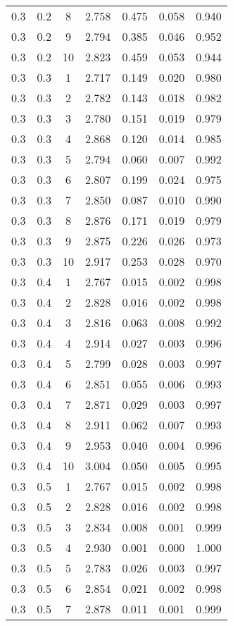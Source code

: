 \begin{tabular}{|c|c|c|c|c|c|c|}
0.3 & 0.2 & 8 & 2.758 & 0.475 & 0.058 & 0.940 \\
0.3 & 0.2 & 9 & 2.794 & 0.385 & 0.046 & 0.952 \\
0.3 & 0.2 & 10 & 2.823 & 0.459 & 0.053 & 0.944 \\
0.3 & 0.3 & 1 & 2.717 & 0.149 & 0.020 & 0.980 \\
0.3 & 0.3 & 2 & 2.782 & 0.143 & 0.018 & 0.982 \\
0.3 & 0.3 & 3 & 2.780 & 0.151 & 0.019 & 0.979 \\
0.3 & 0.3 & 4 & 2.868 & 0.120 & 0.014 & 0.985 \\
0.3 & 0.3 & 5 & 2.794 & 0.060 & 0.007 & 0.992 \\
0.3 & 0.3 & 6 & 2.807 & 0.199 & 0.024 & 0.975 \\
0.3 & 0.3 & 7 & 2.850 & 0.087 & 0.010 & 0.990 \\
0.3 & 0.3 & 8 & 2.876 & 0.171 & 0.019 & 0.979 \\
0.3 & 0.3 & 9 & 2.875 & 0.226 & 0.026 & 0.973 \\
0.3 & 0.3 & 10 & 2.917 & 0.253 & 0.028 & 0.970 \\
0.3 & 0.4 & 1 & 2.767 & 0.015 & 0.002 & 0.998 \\
0.3 & 0.4 & 2 & 2.828 & 0.016 & 0.002 & 0.998 \\
0.3 & 0.4 & 3 & 2.816 & 0.063 & 0.008 & 0.992 \\
0.3 & 0.4 & 4 & 2.914 & 0.027 & 0.003 & 0.996 \\
0.3 & 0.4 & 5 & 2.799 & 0.028 & 0.003 & 0.997 \\
0.3 & 0.4 & 6 & 2.851 & 0.055 & 0.006 & 0.993 \\
0.3 & 0.4 & 7 & 2.871 & 0.029 & 0.003 & 0.997 \\
0.3 & 0.4 & 8 & 2.911 & 0.062 & 0.007 & 0.993 \\
0.3 & 0.4 & 9 & 2.953 & 0.040 & 0.004 & 0.996 \\
0.3 & 0.4 & 10 & 3.004 & 0.050 & 0.005 & 0.995 \\
0.3 & 0.5 & 1 & 2.767 & 0.015 & 0.002 & 0.998 \\
0.3 & 0.5 & 2 & 2.828 & 0.016 & 0.002 & 0.998 \\
0.3 & 0.5 & 3 & 2.834 & 0.008 & 0.001 & 0.999 \\
0.3 & 0.5 & 4 & 2.930 & 0.001 & 0.000 & 1.000 \\
0.3 & 0.5 & 5 & 2.783 & 0.026 & 0.003 & 0.997 \\
0.3 & 0.5 & 6 & 2.854 & 0.021 & 0.002 & 0.998 \\
0.3 & 0.5 & 7 & 2.878 & 0.011 & 0.001 & 0.999 \\

\end{tabular}
